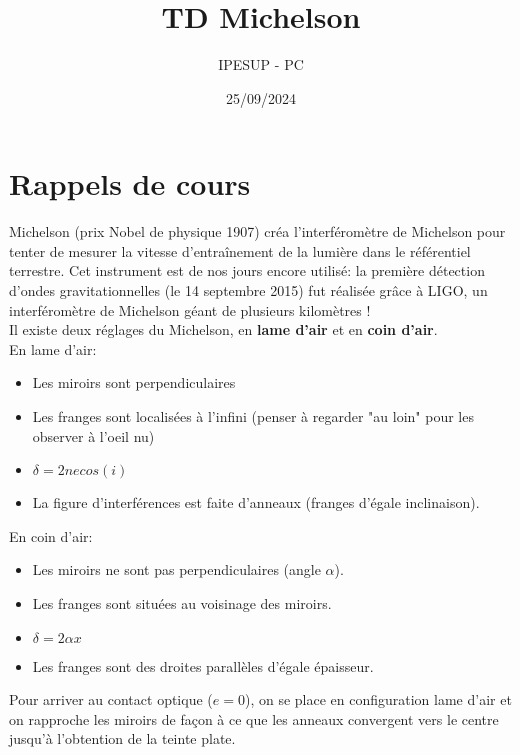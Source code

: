 \documentclass{article}
\title{TD Michelson }
\author{IPESUP - PC }
\date{25/09/2024}
\begin{document}
\maketitle

\section{Rappels de cours}
Michelson (prix Nobel de physique 1907) créa l'interféromètre de Michelson pour tenter de mesurer la vitesse d'entraînement de la lumière dans le référentiel terrestre. 
Cet instrument est de nos jours encore utilisé: la première détection d'ondes gravitationnelles (le 14 septembre 2015) fut réalisée grâce à LIGO, un interféromètre de Michelson géant de plusieurs kilomètres ! \\
Il existe deux réglages du Michelson, en \textbf{lame d'air} et en \textbf{coin d'air}.\\ [0.5cm]
En lame d'air: \\
\begin{itemize}
  \item Les miroirs sont perpendiculaires
  \item Les franges sont localisées à l'infini (penser à regarder "au loin" pour les observer à l'oeil nu)
  \item $\delta = 2ne cos(i)$ 
  \item La figure d'interférences est faite d'anneaux (franges d'égale inclinaison). \\

\end{itemize}

En coin d'air: \\
\begin{itemize}
  \item Les miroirs ne sont pas perpendiculaires (angle $\alpha$). 
  \item Les franges sont situées au voisinage des miroirs. 
  \item $\delta = 2 \alpha x $
  \item Les franges sont des droites parallèles d'égale épaisseur. \\
\end{itemize}

Pour arriver au contact optique ($e=0$), on se place en configuration lame d'air et on rapproche les miroirs de façon à ce que les anneaux convergent vers le centre jusqu'à l'obtention de la teinte plate. 
\end{document}
